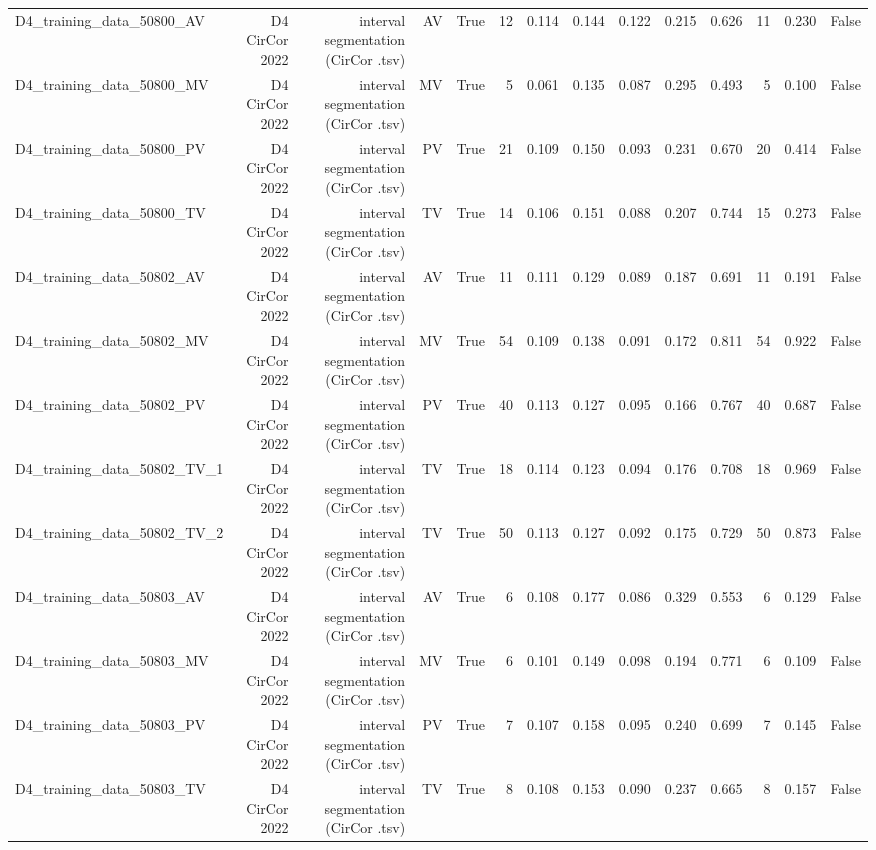 \begin{table}[htbp]
\begin{tabular}{lrrrrrrrrrrrrr}
    D4\_training\_data\_50800\_AV & D4 CirCor 2022 & interval segmentation (CirCor .tsv) & AV & True & 12 & 0.114 & 0.144 & 0.122 & 0.215 & 0.626 & 11 & 0.230 & False \\
    D4\_training\_data\_50800\_MV & D4 CirCor 2022 & interval segmentation (CirCor .tsv) & MV & True & 5 & 0.061 & 0.135 & 0.087 & 0.295 & 0.493 & 5 & 0.100 & False \\
    D4\_training\_data\_50800\_PV & D4 CirCor 2022 & interval segmentation (CirCor .tsv) & PV & True & 21 & 0.109 & 0.150 & 0.093 & 0.231 & 0.670 & 20 & 0.414 & False \\
    D4\_training\_data\_50800\_TV & D4 CirCor 2022 & interval segmentation (CirCor .tsv) & TV & True & 14 & 0.106 & 0.151 & 0.088 & 0.207 & 0.744 & 15 & 0.273 & False \\
    D4\_training\_data\_50802\_AV & D4 CirCor 2022 & interval segmentation (CirCor .tsv) & AV & True & 11 & 0.111 & 0.129 & 0.089 & 0.187 & 0.691 & 11 & 0.191 & False \\
    D4\_training\_data\_50802\_MV & D4 CirCor 2022 & interval segmentation (CirCor .tsv) & MV & True & 54 & 0.109 & 0.138 & 0.091 & 0.172 & 0.811 & 54 & 0.922 & False \\
    D4\_training\_data\_50802\_PV & D4 CirCor 2022 & interval segmentation (CirCor .tsv) & PV & True & 40 & 0.113 & 0.127 & 0.095 & 0.166 & 0.767 & 40 & 0.687 & False \\
    D4\_training\_data\_50802\_TV\_1 & D4 CirCor 2022 & interval segmentation (CirCor .tsv) & TV & True & 18 & 0.114 & 0.123 & 0.094 & 0.176 & 0.708 & 18 & 0.969 & False \\
    D4\_training\_data\_50802\_TV\_2 & D4 CirCor 2022 & interval segmentation (CirCor .tsv) & TV & True & 50 & 0.113 & 0.127 & 0.092 & 0.175 & 0.729 & 50 & 0.873 & False \\
    D4\_training\_data\_50803\_AV & D4 CirCor 2022 & interval segmentation (CirCor .tsv) & AV & True & 6 & 0.108 & 0.177 & 0.086 & 0.329 & 0.553 & 6 & 0.129 & False \\
    D4\_training\_data\_50803\_MV & D4 CirCor 2022 & interval segmentation (CirCor .tsv) & MV & True & 6 & 0.101 & 0.149 & 0.098 & 0.194 & 0.771 & 6 & 0.109 & False \\
    D4\_training\_data\_50803\_PV & D4 CirCor 2022 & interval segmentation (CirCor .tsv) & PV & True & 7 & 0.107 & 0.158 & 0.095 & 0.240 & 0.699 & 7 & 0.145 & False \\
    D4\_training\_data\_50803\_TV & D4 CirCor 2022 & interval segmentation (CirCor .tsv) & TV & True & 8 & 0.108 & 0.153 & 0.090 & 0.237 & 0.665 & 8 & 0.157 & False \\

\end{tabular}
\end{table}

